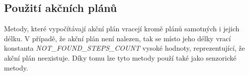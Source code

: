 \subsection{Použití akčních plánů}
Metody, které vypočítávají akční plán vracejí kromě plánů samotných i jejich délku. 
V případě, že akční plán není nalezen, tak se místo jeho délky vrací konstanta \emph{\uppercase{not\_found\_steps\_count}} vysoké hodnoty, reprezentující, že akční plán neexistuje.
Díky tomu lze tyto metody použí také jako senzorické metody. 


